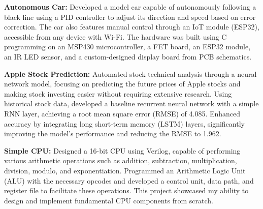 \documentclass[letterpaper,10pt]{article}
\begin{document}
\noindent \textbf{Autonomous Car:} Developed a model car capable of autonomously following a black line using a PID controller to adjust its direction and speed based on error correction. The car also features manual control through an IoT module (ESP32), accessible from any device with Wi-Fi. The hardware was built using C programming on an MSP430 microcontroller, a FET board, an ESP32 module, an IR LED sensor, and a custom-designed display board from PCB schematics.

\noindent \textbf{Apple Stock Prediction:} Automated stock technical analysis through a neural network model, focusing on predicting the future prices of Apple stocks and making stock investing easier without requiring extensive research. Using historical stock data, developed a baseline recurrent neural network with a simple RNN layer, achieving a root mean square error (RMSE) of 4.085. Enhanced accuracy by integrating long short-term memory (LSTM) layers, significantly improving the model’s performance and reducing the RMSE to 1.962.

\noindent \textbf{Simple CPU:} Designed a 16-bit CPU using Verilog, capable of performing various arithmetic operations such as addition, subtraction, multiplication, division, modulo, and exponentiation. Programmed an Arithmetic Logic Unit (ALU) with the necessary opcodes and developed a control unit, data path, and register file to facilitate these operations. This project showcased my ability to design and implement fundamental CPU components from scratch.
\end{document}
